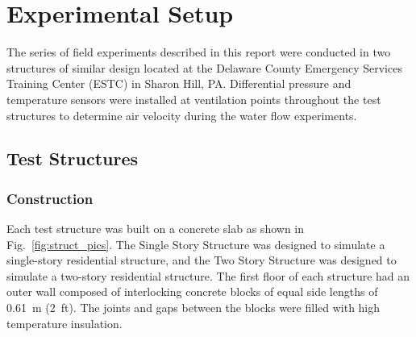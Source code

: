 \documentclass[12pt,oneside]{book}
\begin{document}
\section{Experimental Setup}
\label{sec:exp_setup}
The series of field experiments described in this report were conducted in two structures of similar design located at the Delaware County Emergency Services Training Center (ESTC) in Sharon Hill, PA. Differential pressure and temperature sensors were installed at ventilation points throughout the test structures to determine air velocity during the water flow experiments.  

\subsection{Test Structures}
\label{sec:test_structs}

\subsubsection{Construction}
\label{sec:construction}
Each test structure was built on a concrete slab as shown in Fig.~\ref{fig:struct_pics}. The Single Story Structure was designed to simulate a single-story residential structure, and the Two Story Structure was designed to simulate a two-story residential structure. The first floor of each structure had an outer wall composed of interlocking concrete blocks of equal side lengths of 0.61~m (2~ft). The joints and gaps between the blocks were filled with high temperature insulation.
\end{document}
